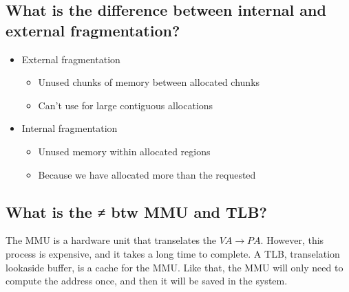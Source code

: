 \documentclass[a4paper]{article}
\begin{document}
\subsection{What is the difference between internal and external fragmentation?} %
\label{sub:What is the ≠ btw internal and external fragmentation?}
\begin{itemize}
  \item External fragmentation
    \begin{itemize}
      \item Unused chunks of memory between allocated chunks
      \item Can't use for large contiguous allocations
    \end{itemize}
  \item Internal fragmentation
    \begin{itemize}
      \item Unused memory within allocated regions
      \item Because we have allocated more than the requested
    \end{itemize}
\end{itemize}
\subsection{What is the ≠ btw MMU and TLB?} %
\label{sub:What is the ≠ btw MMU and TLB?}
The MMU is a hardware unit that transelates the $VA \rightarrow PA$. However, this process is expensive, and it takes a long time to complete.
A TLB, transelation lookaside buffer, is a cache for the MMU. Like that, the MMU will only need to compute the address once, and then it will be saved in the system.
\end{document}
